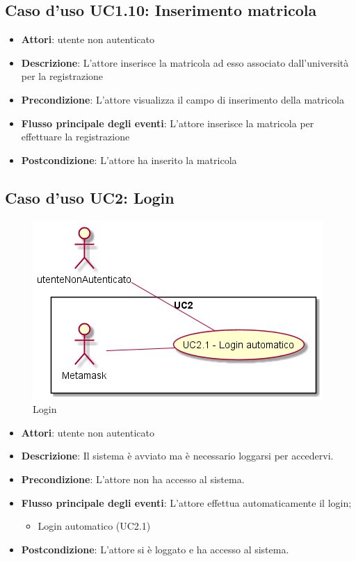 \subsection{Caso d'uso \texorpdfstring{UC1.10}{UC1.10}: Inserimento matricola}
\begin{itemize}
\item \textbf{Attori}: utente non autenticato
\item \textbf{Descrizione}: L'attore inserisce la matricola ad esso associato dall'università per la registrazione
\item \textbf{Precondizione}: L'attore visualizza il campo di inserimento della matricola
\item \textbf{Flusso principale degli eventi}: L'attore inserisce la matricola per effettuare la registrazione
\item \textbf{Postcondizione}: L'attore ha inserito la matricola
\end{itemize}
\subsection{Caso d'uso \texorpdfstring{UC2}{UC2}: Login}
\begin{figure} [H]
\centering
\includegraphics[scale=0.45]{./img/UC2.png}
\caption{Login}\label{}
\end{figure}
\begin{itemize}
\item \textbf{Attori}: utente non autenticato
\item \textbf{Descrizione}: Il sistema è avviato ma è necessario loggarsi per accedervi.
\item \textbf{Precondizione}: L'attore non ha accesso al sistema.
\item \textbf{Flusso principale degli eventi}: L'attore effettua automaticamente il login;
\begin{itemize}
\item Login automatico (UC2.1)
\end{itemize}
\item \textbf{Postcondizione}: L'attore si è loggato e ha accesso al sistema.
\end{itemize}
